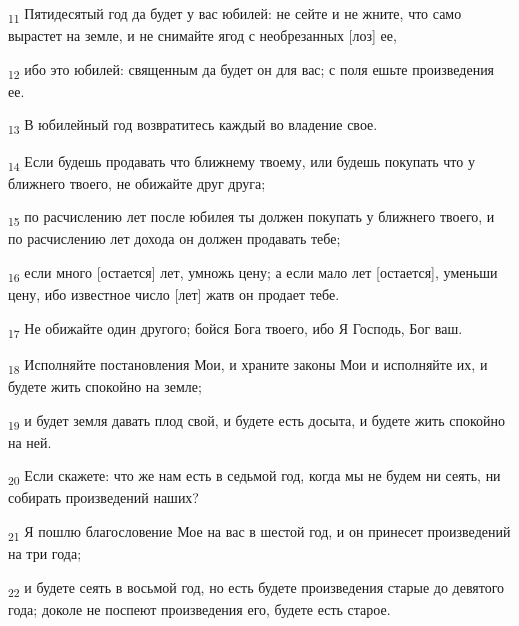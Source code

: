 \begin{tcolorbox}
\textsubscript{11} Пятидесятый год да будет у вас юбилей: не сейте и не жните, что само вырастет на земле, и не снимайте ягод с необрезанных [лоз] ее,
\end{tcolorbox}
\begin{tcolorbox}
\textsubscript{12} ибо это юбилей: священным да будет он для вас; с поля ешьте произведения ее.
\end{tcolorbox}
\begin{tcolorbox}
\textsubscript{13} В юбилейный год возвратитесь каждый во владение свое.
\end{tcolorbox}
\begin{tcolorbox}
\textsubscript{14} Если будешь продавать что ближнему твоему, или будешь покупать что у ближнего твоего, не обижайте друг друга;
\end{tcolorbox}
\begin{tcolorbox}
\textsubscript{15} по расчислению лет после юбилея ты должен покупать у ближнего твоего, и по расчислению лет дохода он должен продавать тебе;
\end{tcolorbox}
\begin{tcolorbox}
\textsubscript{16} если много [остается] лет, умножь цену; а если мало лет [остается], уменьши цену, ибо известное число [лет] жатв он продает тебе.
\end{tcolorbox}
\begin{tcolorbox}
\textsubscript{17} Не обижайте один другого; бойся Бога твоего, ибо Я Господь, Бог ваш.
\end{tcolorbox}
\begin{tcolorbox}
\textsubscript{18} Исполняйте постановления Мои, и храните законы Мои и исполняйте их, и будете жить спокойно на земле;
\end{tcolorbox}
\begin{tcolorbox}
\textsubscript{19} и будет земля давать плод свой, и будете есть досыта, и будете жить спокойно на ней.
\end{tcolorbox}
\begin{tcolorbox}
\textsubscript{20} Если скажете: что же нам есть в седьмой год, когда мы не будем ни сеять, ни собирать произведений наших?
\end{tcolorbox}
\begin{tcolorbox}
\textsubscript{21} Я пошлю благословение Мое на вас в шестой год, и он принесет произведений на три года;
\end{tcolorbox}
\begin{tcolorbox}
\textsubscript{22} и будете сеять в восьмой год, но есть будете произведения старые до девятого года; доколе не поспеют произведения его, будете есть старое.
\end{tcolorbox}
